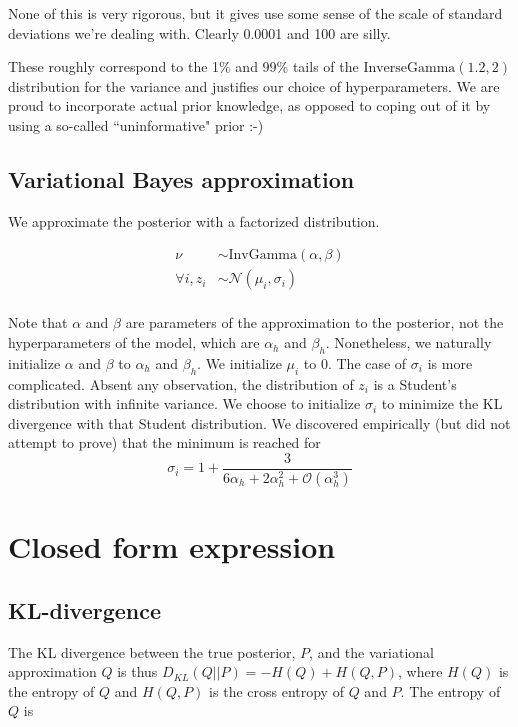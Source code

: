 \documentclass[12pt]{article}
\begin{document}
    None of this is very rigorous, but it gives use some sense of the scale
    of standard deviations we're dealing with. Clearly 0.0001 and 100 are silly.

    These roughly correspond to the 1\% and 99\% tails of the
    $\text{InverseGamma}(1.2, 2)$ distribution for the variance and justifies our choice of hyperparameters.
    We are proud to incorporate actual prior knowledge, as opposed
    to coping out of it by using a so-called ``uninformative" prior :-)

\subsection{Variational Bayes approximation}

We approximate the posterior with a factorized distribution.

\begin{equation}
    \begin{aligned}
        \nu &\sim \text{InvGamma}(\alpha, \beta) \\
        \forall i, z_i &\sim \mathcal{N}(\mu_i, \sigma_i) \\
    \end{aligned}
\end{equation}

Note that $\alpha$ and $\beta$ are parameters of the approximation to the posterior, not the hyperparameters of the model, which are
$\alpha_h$ and $\beta_h$. Nonetheless, we naturally initialize $\alpha$ and $\beta$ to $\alpha_h$ and $\beta_h$. We initialize $\mu_i$ to $0$.
The case of $\sigma_i$ is more complicated. Absent any observation, the distribution of $z_i$ is a Student's distribution with
infinite variance. We choose to initialize $\sigma_i$ to minimize the KL divergence with that Student distribution. We discovered
empirically (but did not attempt to prove) that the minimum is reached for
$$\sigma_i = 1 + \frac{3}{6 \alpha_h + 2 \alpha_h^2 + \mathcal{O}(\alpha_h^3)}$$


\section{Closed form expression }

\subsection{KL-divergence}

The KL divergence between the true posterior, $P$, and the variational approximation $Q$ is thus $D_{KL}(Q||P) = - H(Q) + H(Q,P)$,
where $H(Q)$ is the entropy of $Q$ and $H(Q,P)$ is the cross entropy of $Q$ and $P$. The entropy of $Q$ is
\end{document}
